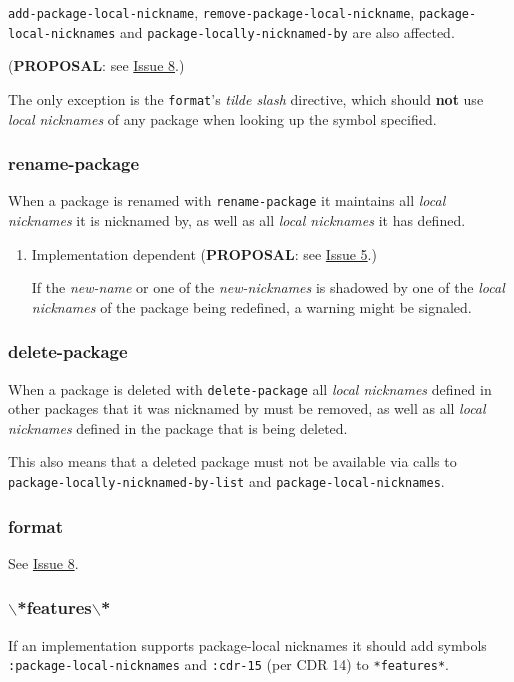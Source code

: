 \documentclass[11pt]{article}
\begin{document}
\texttt{add-package-local-nickname}, \texttt{remove-package-local-nickname},
\texttt{package-local-nicknames} and \texttt{package-locally-nicknamed-by} are also affected.

(\textbf{PROPOSAL}: see \hyperref[sec:orgf59d09e]{Issue 8}.)

The only exception is the \texttt{format}'s \emph{tilde slash} directive, which should \textbf{not}
use \emph{local nicknames} of any package when looking up the symbol specified.
\subsubsection{rename-package}
\label{sec:org671adcf}
When a package is renamed with \texttt{rename-package} it maintains all \emph{local nicknames}
it is nicknamed by, as well as all \emph{local nicknames} it has defined.
\begin{enumerate}
\item Implementation dependent
\label{sec:orgb2ead79}
(\textbf{PROPOSAL}: see \hyperref[sec:org39f8c46]{Issue 5}.)

If the \emph{new-name} or one of the \emph{new-nicknames} is shadowed by one of the \emph{local
nicknames} of the package being redefined, a warning might be signaled.
\end{enumerate}
\subsubsection{delete-package}
\label{sec:org379d2ff}
When a package is deleted with \texttt{delete-package} all \emph{local nicknames} defined in
other packages that it was nicknamed by must be removed, as well as all \emph{local
nicknames} defined in the package that is being deleted.

This also means that a deleted package must not be available via calls to
\texttt{package-locally-nicknamed-by-list} and \texttt{package-local-nicknames}.
\subsubsection{format}
\label{sec:orgdf53675}
See \hyperref[sec:orgf59d09e]{Issue 8}.
\subsubsection{$\backslash$*features$\backslash$*}
\label{sec:orgbb01881}
If an implementation supports package-local nicknames it should add symbols
\texttt{:package-local-nicknames} and \texttt{:cdr-15} (per CDR 14) to \texttt{*features*}.
\end{document}
